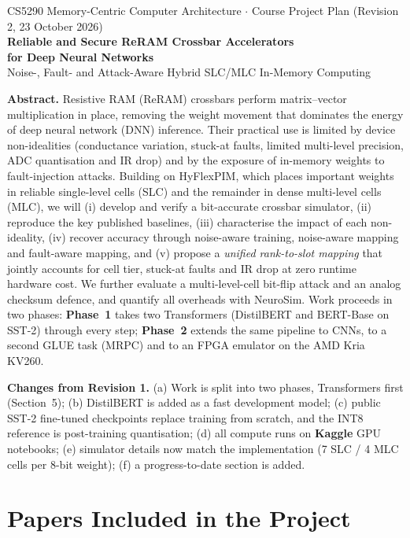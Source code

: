\documentclass[10pt,a4paper]{article}
\begin{document}
\begin{center}
{\small CS5290 Memory-Centric Computer Architecture $\cdot$ Course Project Plan (Revision 2, 23 October 2026)}\\[6pt]
{\LARGE\bfseries Reliable and Secure ReRAM Crossbar Accelerators}\\[2pt]
{\LARGE\bfseries for Deep Neural Networks}\\[6pt]
{\large Noise-, Fault- and Attack-Aware Hybrid SLC/MLC In-Memory Computing}
\end{center}

\noindent\textbf{Abstract.} Resistive RAM (ReRAM) crossbars perform matrix--vector multiplication in
place, removing the weight movement that dominates the energy of deep neural network (DNN) inference.
Their practical use is limited by device non-idealities (conductance variation, stuck-at faults,
limited multi-level precision, ADC quantisation and IR drop) and by the exposure of in-memory weights
to fault-injection attacks. Building on HyFlexPIM, which places important weights in reliable
single-level cells (SLC) and the remainder in dense multi-level cells (MLC), we will (i) develop and
verify a bit-accurate crossbar simulator, (ii) reproduce the key published baselines, (iii)
characterise the impact of each non-ideality, (iv) recover accuracy through noise-aware training,
noise-aware mapping and fault-aware mapping, and (v) propose a \emph{unified rank-to-slot mapping} that
jointly accounts for cell tier, stuck-at faults and IR drop at zero runtime hardware cost. We further
evaluate a multi-level-cell bit-flip attack and an analog checksum defence, and quantify all overheads
with NeuroSim. Work proceeds in two phases: \textbf{Phase~1} takes two Transformers (DistilBERT and
BERT-Base on SST-2) through every step; \textbf{Phase~2} extends the same pipeline to CNNs, to a second
GLUE task (MRPC) and to an FPGA emulator on the AMD Kria KV260.

\vspace{4pt}
\noindent\textbf{Changes from Revision 1.}
(a) Work is split into two phases, Transformers first (Section~5);
(b) DistilBERT is added as a fast development model;
(c) public SST-2 fine-tuned checkpoints replace training from scratch, and the INT8 reference is
post-training quantisation;
(d) all compute runs on \textbf{Kaggle} GPU notebooks;
(e) simulator details now match the implementation (7 SLC / 4 MLC cells per 8-bit weight);
(f) a progress-to-date section is added.

\section{Papers Included in the Project}
\end{document}
